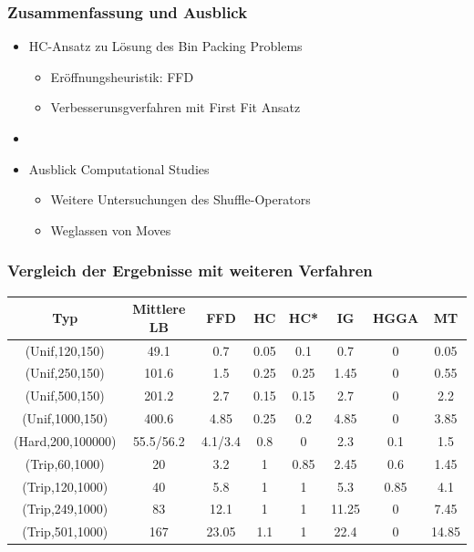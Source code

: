 \documentclass{beamer}
\begin{document}
\begin{frame}
\frametitle{Zusammenfassung und Ausblick}
\begin{itemize}
\item HC-Ansatz zu Lösung des Bin Packing Problems
\begin{itemize}
\item Eröffnungsheuristik: FFD
\item Verbesserunsgverfahren mit First Fit Ansatz
\end{itemize}
\item[] 
\item Ausblick Computational Studies
\begin{itemize}
\item Weitere Untersuchungen des Shuffle-Operators
\item Weglassen von Moves
\end{itemize}
\end{itemize}


\end{frame}
\begin{frame}
\frametitle{Vergleich der Ergebnisse mit weiteren Verfahren}
\begin{table}
\begin{footnotesize}

\begin{tabular}{c c c c c c c c}
\toprule
\textbf{Typ} & \textbf{Mittlere LB} & \textbf{FFD} & \textbf{HC} & \textbf{HC*}  & \textbf{IG} & \textbf{HGGA} & \textbf{MT}\\
\midrule
(Unif,120,150) & 49.1  & 0.7 & 0.05 & 0.1 & 0.7 & 0 & 0.05 \\
(Unif,250,150) & 101.6  & 1.5 & 0.25 & 0.25 & 1.45 & 0 & 0.55\\
(Unif,500,150)  & 201.2  & 2.7 & 0.15 & 0.15 &  2.7 & 0 & 2.2\\
(Unif,1000,150)   & 400.6  & 4.85 & 0.25 & 0.2 & 4.85 & 0 & 3.85\\ \midrule
(Hard,200,100000)  & 55.5/56.2  & 4.1/3.4 & 0.8 & 0 & 2.3 & 0.1 & 1.5 \\\midrule
(Trip,60,1000)     & 20 & 3.2 & 1 & 0.85 & 2.45 & 0.6 & 1.45 \\
(Trip,120,1000)    & 40  & 5.8 & 1 &1 & 5.3 & 0.85 & 4.1\\
(Trip,249,1000)     & 83  & 12.1 & 1 & 1 & 11.25 & 0 & 7.45 \\
(Trip,501,1000)     & 167  & 23.05 & 1.1 & 1 & 22.4 & 0 & 14.85 \\
\bottomrule
\end{tabular}

\end{footnotesize}
\end{table}


\end{frame}
\end{document}
